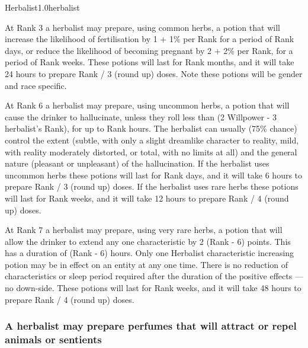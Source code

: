 \begin{skill}{Herbalist}{1.0}{herbalist}
\begin{Enumerate}

\item At Rank 3 a herbalist may prepare, using common herbs, a potion
that will increase the likelihood of fertilisation by 1 + 1\% per Rank
for a period of Rank days, or reduce the likelihood of becoming
pregnant by 2 + 2\% per Rank, for a period of Rank weeks.  These
potions will last for Rank months, and it will take 24 hours to
prepare Rank / 3 (round up) doses.  Note these potions will be gender
and race specific.


\item At Rank 6 a herbalist may prepare, using uncommon herbs, a
potion that will cause the drinker to hallucinate, unless they roll
less than (2 \x Willpower - 3 \x herbalist's Rank), for up to Rank
hours.  The herbalist can usually (75\% chance) control the extent
(\ie subtle, with only a slight dreamlike character to reality, mild,
with reality moderately distorted, or total, with no limits at all)
and the general nature (\ie pleasant or unpleasant) of the
hallucination.  If the herbalist uses uncommon herbs these potions
will last for Rank days, and it will take 6 hours to prepare Rank / 3
(round up) doses. If the herbalist uses rare herbs these potions will
last for Rank weeks, and it will take 12 hours to prepare Rank / 4
(round up) doses.

\item At Rank 7 a herbalist may prepare, using very rare herbs, a
potion that will allow the drinker to extend any one characteristic by
2 \x (Rank - 6) points.  This has a duration of (Rank - 6) hours. Only
one Herbalist characteristic increasing potion may be in effect on an
entity at any one time. There is no reduction of characteristics or
sleep period required after the duration of the positive effects ---
\ie no down-side.  These potions will last for Rank  weeks, and
it will take 48 hours to prepare Rank / 4 (round up) doses.

\end{Enumerate}

\subsubsection{A herbalist may prepare perfumes that will attract or
repel animals or sentients}


\end{skill}
